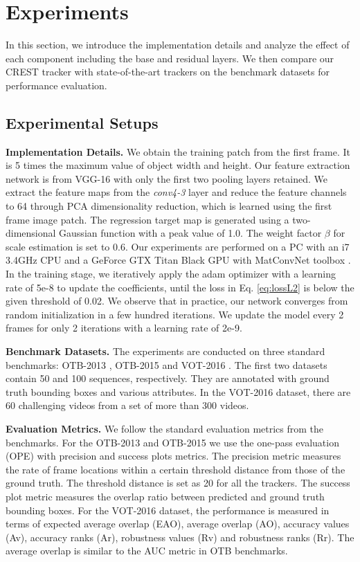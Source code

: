 \documentclass[10pt,twocolumn,letterpaper]{article}
\begin{document}
\section{Experiments}
In this section, we introduce the implementation details and analyze the effect of each component including the base and residual layers. We then compare our CREST tracker with state-of-the-art trackers on the benchmark datasets for performance evaluation.

\subsection{Experimental Setups}

{\flushleft \bf Implementation Details.}
We obtain the training patch from the first frame. It is 5 times the maximum value of object width and height. Our feature extraction network is from VGG-16 \cite{simonyan-iclr14-very} with only the first two pooling layers retained. We extract the feature maps from the \textit{conv4-3} layer and reduce the feature channels to 64 through PCA dimensionality reduction, which is learned using the first frame image patch. The regression target map is generated using a two-dimensional Gaussian function with a peak value of 1.0. The weight factor $\beta$ for scale estimation is set to 0.6. Our experiments are performed on a PC with an i7 3.4GHz CPU and a GeForce GTX Titan Black GPU with MatConvNet toolbox \cite{Vedaldi-mm15-matconvnet}. In the training stage, we iteratively apply the adam optimizer \cite{Diederik-iclr15-adam} with a learning rate of 5e-8 to update the coefficients, until the loss in Eq. \ref{eq:lossL2} is below the given threshold of 0.02. We observe that in practice, our network converges from random initialization in a few hundred iterations. We update the model every 2 frames for only 2 iterations with a learning rate of 2e-9.

{\flushleft \bf Benchmark Datasets.}
The experiments are conducted on three standard benchmarks: OTB-2013 \cite{wu-cvpr13-otb}, OTB-2015 \cite{wu-pami15-otb} and VOT-2016 \cite{kristan-eccvw16-vot}. The first two datasets contain 50 and 100 sequences, respectively. They are annotated with ground truth bounding boxes and various attributes. In the VOT-2016 dataset, there are 60 challenging videos from a set of more than 300 videos.

{\flushleft \bf Evaluation Metrics.}
We follow the standard evaluation metrics from the benchmarks. For the OTB-2013 and OTB-2015 we use the one-pass evaluation (OPE) with precision and success plots metrics. The precision metric measures the rate of frame locations within a certain threshold distance from those of the ground truth. The threshold distance is set as 20 for all the trackers. The success plot metric measures the overlap ratio between predicted and ground truth bounding boxes. For the VOT-2016 dataset, the performance is measured in terms of expected average overlap (EAO), average overlap (AO), accuracy values (Av), accuracy ranks (Ar), robustness values (Rv) and robustness ranks (Rr). The average overlap is similar to the AUC metric in OTB benchmarks.
\end{document}
